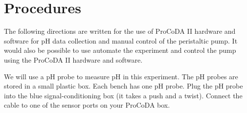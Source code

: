 \documentclass[letterpaper,10pt,english]{sphinxmanual}
\begin{document}
\section{Procedures}
\label{\detokenize{Acid_Rain/Acid_Rain:procedures}}\label{\detokenize{Acid_Rain/Acid_Rain:heading-acid-rain-procedures}}
The following directions are written for the use of ProCoDA II hardware and software for pH data collection and manual control of the peristaltic pump. It would also be possible to use automate the experiment and control the pump using the ProCoDA II hardware and software.

We will use a pH probe to measure pH in this experiment. The pH probes are stored in a small plastic box.  Each bench has one pH probe. Plug the pH probe into the blue signal-conditioning box (it takes a push and a twist). Connect the cable to one of the sensor ports on your ProCoDA box.
\end{document}

